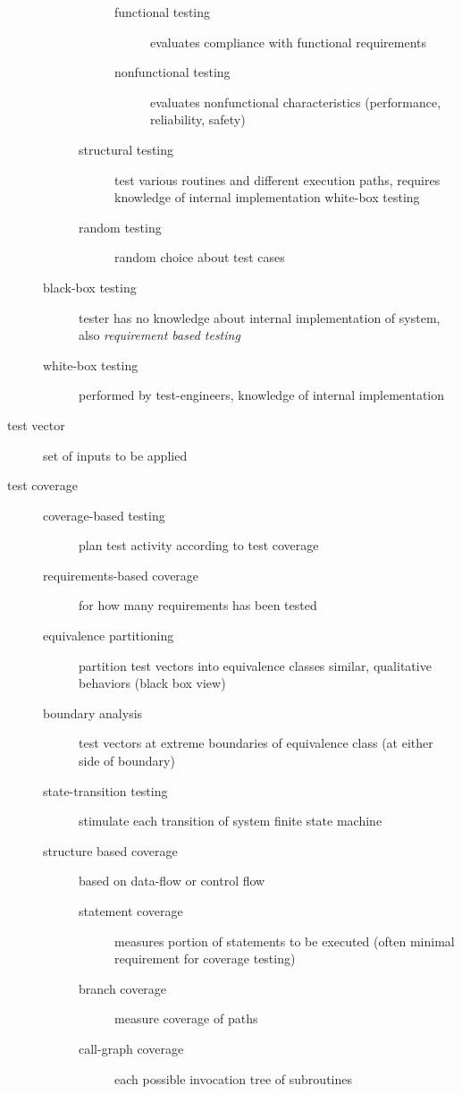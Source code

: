 \documentclass[a4paper, 10pt]{article}
\begin{document}
\begin{description}
\begin{description}
\begin{description}
\begin{description}
                \item[functional testing] evaluates compliance with functional requirements
                \item[nonfunctional testing] evaluates nonfunctional characteristics (performance, reliability, safety)
            \end{description}
            \item[structural testing] test various routines and different execution paths, requires knowledge of internal implementation \follows white-box testing
            \item[random testing] random choice about test cases
        \end{description}
        \item[black-box testing] tester has no knowledge about internal implementation of system, also \emph{requirement based testing}
        \item[white-box testing] performed by test-engineers, knowledge of internal implementation
    \end{description}
    \item[test vector] set of inputs to be applied
    \item[test coverage]
    \begin{description}
        \item[coverage-based testing] plan test activity according to test coverage
        \item[requirements-based coverage] for how many requirements has been tested
        \item[equivalence partitioning] partition test vectors into equivalence classes \follows similar, qualitative behaviors (black box view)
        \item[boundary analysis] test vectors at extreme boundaries of equivalence class (at either side of boundary)
        \item[state-transition testing] stimulate each transition of system \follows finite state machine
        \item[structure based coverage] based on data-flow or control flow
        \begin{description}
            \item[statement coverage] measures portion of statements to be executed (often minimal requirement for coverage testing)
            \item[branch coverage] measure coverage of paths
            \item[call-graph coverage] each possible invocation tree of subroutines
        \end{description}
    \end{description}
\end{description}
\end{document}
